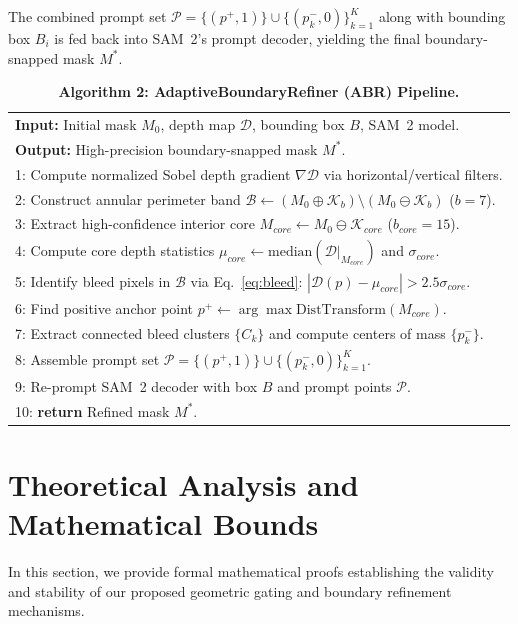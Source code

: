 \documentclass[10pt,twocolumn,letterpaper]{article}
\begin{document}
The combined prompt set $\mathcal{P} = \{ (p^+, 1) \} \cup \{ (p_k^-, 0) \}_{k=1}^K$ along with bounding box $B_i$ is fed back into SAM~2's prompt decoder, yielding the final boundary-snapped mask $M^*$.

\begin{table}[ht]
\centering
\footnotesize
\caption{\textbf{Algorithm 2: AdaptiveBoundaryRefiner (ABR) Pipeline.}}
\label{alg:abr}
\begin{tabularx}{\columnwidth}{X}
\toprule
\textbf{Input:} Initial mask $M_0$, depth map $\mathcal{D}$, bounding box $B$, SAM~2 model. \\
\textbf{Output:} High-precision boundary-snapped mask $M^*$. \\
\midrule
1: Compute normalized Sobel depth gradient $\nabla \mathcal{D}$ via horizontal/vertical filters. \\
2: Construct annular perimeter band $\mathcal{B} \leftarrow (M_0 \oplus \mathcal{K}_b) \setminus (M_0 \ominus \mathcal{K}_b)$ ($b=7$). \\
3: Extract high-confidence interior core $M_{core} \leftarrow M_0 \ominus \mathcal{K}_{core}$ ($b_{core}=15$). \\
4: Compute core depth statistics $\mu_{core} \leftarrow \mathrm{median}(\mathcal{D}|_{M_{core}})$ and $\sigma_{core}$. \\
5: Identify bleed pixels in $\mathcal{B}$ via Eq.~\eqref{eq:bleed}: $|\mathcal{D}(p) - \mu_{core}| > 2.5\sigma_{core}$. \\
6: Find positive anchor point $p^+ \leftarrow \arg\max \mathrm{DistTransform}(M_{core})$. \\
7: Extract connected bleed clusters $\{C_k\}$ and compute centers of mass $\{p_k^-\}$. \\
8: Assemble prompt set $\mathcal{P} = \{ (p^+, 1) \} \cup \{ (p_k^-, 0) \}_{k=1}^K$. \\
9: Re-prompt SAM~2 decoder with box $B$ and prompt points $\mathcal{P}$. \\
10: \textbf{return} Refined mask $M^*$. \\
\bottomrule
\end{tabularx}
\end{table}

\section{Theoretical Analysis and Mathematical Bounds}
\label{sec:theory}

In this section, we provide formal mathematical proofs establishing the validity and stability of our proposed geometric gating and boundary refinement mechanisms.
\end{document}
